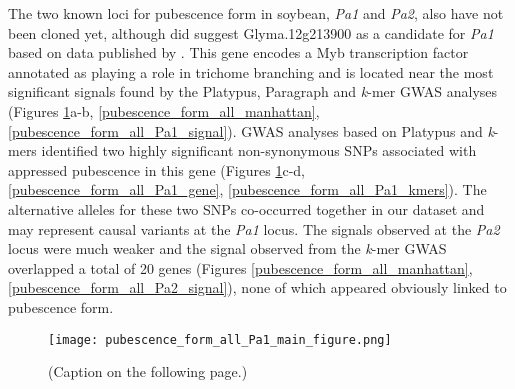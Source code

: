 The two known loci for pubescence form in soybean, \textit{Pa1} and
\textit{Pa2}, also have not been cloned yet, although \cite{gilbert2017} did
suggest Glyma.12g213900 as a candidate for \textit{Pa1} based on data published
by \cite{bandillo2017}. This gene encodes a Myb transcription factor annotated
as playing a role in trichome branching and is located near the most
significant signals found by the Platypus, Paragraph and \emph{k}-mer GWAS
analyses (Figures \ref{pubescence-form-main-figure}a-b,
\ref{pubescence_form_all_manhattan}, \ref{pubescence_form_all_Pa1_signal}).
GWAS analyses based on Platypus and \emph{k}-mers identified two highly
significant non-synonymous SNPs associated with appressed pubescence in this
gene (Figures \ref{pubescence-form-main-figure}c-d, \ref{pubescence_form_all_Pa1_gene},
\ref{pubescence_form_all_Pa1_kmers}). The alternative alleles for these two
SNPs co-occurred together in our dataset and may represent causal variants at
the \emph{Pa1} locus. The signals observed at the \emph{Pa2} locus were much
weaker and the signal observed from the \emph{k}-mer GWAS overlapped a total of
20 genes (Figures \ref{pubescence_form_all_manhattan},
\ref{pubescence_form_all_Pa2_signal}), none of which appeared obviously linked
to pubescence form.

\begin{figure}
	\centering
	\texttt{[image: pubescence\_form\_all\_Pa1\_main\_figure.png]}
	\caption[Results of SNP/indel- and \textit{k}-mer-based GWAS at the
	\textit{Pa1} locus for pubescence form]{(Caption on the following page.)}
	\label{pubescence-form-main-figure}
\end{figure}

